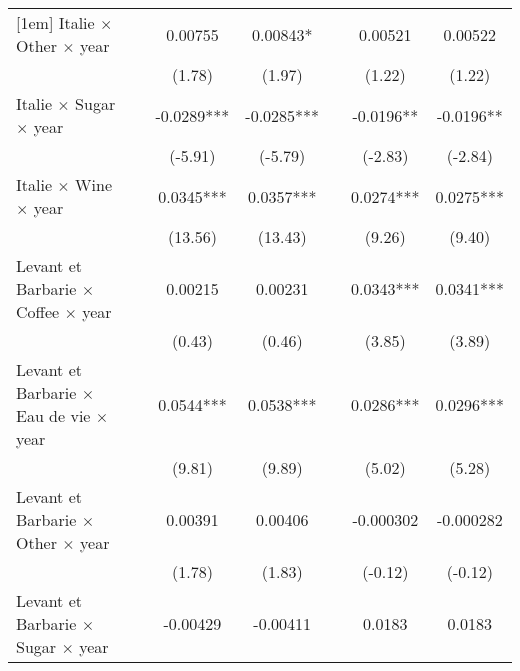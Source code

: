 {\begin{tabular}{l*{6}{c}}
[1em]
Italie $\times$ Other $\times$ year&                     &     0.00755         &     0.00843*  &                     &     0.00521         &     0.00522         \\
                    &                     &      (1.78)         &      (1.97)         &                     &      (1.22)         &      (1.22)         \\
[1em]
Italie $\times$ Sugar $\times$ year&                     &     -0.0289***&     -0.0285***&                     &     -0.0196** &     -0.0196** \\
                    &                     &     (-5.91)         &     (-5.79)         &                     &     (-2.83)         &     (-2.84)         \\
[1em]
Italie $\times$ Wine $\times$ year&                     &      0.0345***&      0.0357***&                     &      0.0274***&      0.0275***\\
                    &                     &     (13.56)         &     (13.43)         &                     &      (9.26)         &      (9.40)         \\
[1em]
Levant et Barbarie $\times$ Coffee $\times$ year&                     &     0.00215         &     0.00231         &                     &      0.0343***&      0.0341***\\
                    &                     &      (0.43)         &      (0.46)         &                     &      (3.85)         &      (3.89)         \\
[1em]
Levant et Barbarie $\times$ Eau de vie $\times$ year&                     &      0.0544***&      0.0538***&                     &      0.0286***&      0.0296***\\
                    &                     &      (9.81)         &      (9.89)         &                     &      (5.02)         &      (5.28)         \\
[1em]
Levant et Barbarie $\times$ Other $\times$ year&                     &     0.00391         &     0.00406         &                     &   -0.000302         &   -0.000282         \\
                    &                     &      (1.78)         &      (1.83)         &                     &     (-0.12)         &     (-0.12)         \\
[1em]
Levant et Barbarie $\times$ Sugar $\times$ year&                     &    -0.00429         &    -0.00411         &                     &      0.0183         &      0.0183         \\

\end{tabular}}
